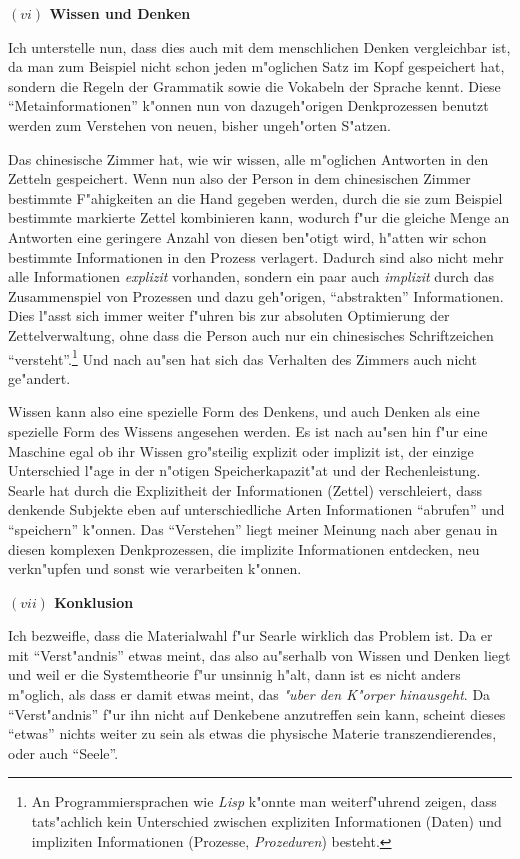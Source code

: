 \documentclass[a4paper, emulatestandardclasses, 12pt]{scrartcl}
\begin{document}
\begin{onehalfspace}
\vspace{5mm}
\noindent\textbf{$(vi)$ Wissen und Denken}

\noindent Ich unterstelle nun, dass dies auch mit dem menschlichen Denken vergleichbar ist, da man zum Beispiel nicht schon jeden m"oglichen Satz im Kopf gespeichert hat, sondern die Regeln der Grammatik sowie die Vokabeln der Sprache kennt. Diese "`Metainformationen"' k"onnen nun von dazugeh"origen Denkprozessen benutzt werden zum Verstehen von neuen, bisher ungeh"orten S"atzen.

Das chinesische Zimmer hat, wie wir wissen, alle m"oglichen Antworten in den Zetteln gespeichert. Wenn nun also der Person in dem chinesischen Zimmer bestimmte F"ahigkeiten an die Hand gegeben werden, durch die sie zum Beispiel bestimmte markierte Zettel kombinieren kann, wodurch f"ur die gleiche Menge an Antworten eine geringere Anzahl von diesen ben"otigt wird, h"atten wir schon bestimmte Informationen in den Prozess verlagert. Dadurch sind also nicht mehr alle Informationen \emph{explizit} vorhanden, sondern ein paar auch \emph{implizit} durch das Zusammenspiel von Prozessen und dazu geh"origen, "`abstrakten"' Informationen. Dies l"asst sich immer weiter f"uhren bis zur absoluten Optimierung der Zettelverwaltung, ohne dass die Person auch nur ein chinesisches Schriftzeichen "`versteht"'.\footnote{An Programmiersprachen wie \emph{Lisp} k"onnte man weiterf"uhrend zeigen, dass tats"achlich kein Unterschied zwischen expliziten Informationen (Daten) und impliziten Informationen (Prozesse, \emph{Prozeduren}) besteht.} Und nach au"sen hat sich das Verhalten des Zimmers auch nicht ge"andert. 

Wissen kann also eine spezielle Form des Denkens, und auch Denken als eine spezielle Form des Wissens angesehen werden. Es ist nach au"sen hin f"ur eine Maschine egal ob ihr Wissen gro"steilig explizit oder implizit ist, der einzige Unterschied l"age in der n"otigen Speicherkapazit"at und der Rechenleistung. Searle hat durch die Explizitheit der Informationen (Zettel) verschleiert, dass denkende Subjekte eben auf unterschiedliche Arten  Informationen "`abrufen"' und  "`speichern"' k"onnen. Das "`Verstehen"' liegt meiner Meinung nach aber genau in diesen komplexen Denkprozessen, die implizite Informationen entdecken, neu verkn"upfen und sonst wie verarbeiten k"onnen.

\vspace{5mm}
\noindent\textbf{$(vii)$ Konklusion}

\noindent Ich bezweifle, dass die Materialwahl f"ur Searle wirklich das Problem ist. Da er mit "`Verst"andnis"' etwas meint, das also au"serhalb von Wissen und Denken liegt und weil er die Systemtheorie f"ur unsinnig h"alt, dann ist es nicht anders m"oglich, als dass er damit etwas meint, das \emph{"uber den K"orper hinausgeht}. Da "`Verst"andnis"' f"ur ihn nicht auf Denkebene anzutreffen sein kann, scheint dieses "`etwas"' nichts weiter zu sein als etwas die physische Materie transzendierendes, oder auch "`Seele"'.


\end{onehalfspace}
\end{document}
